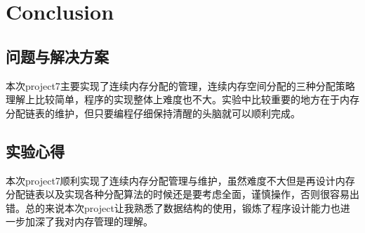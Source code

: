 \documentclass{article}
\begin{document}
\section{Conclusion}

\subsection{问题与解决方案}
本次project7主要实现了连续内存分配的管理，连续内存空间分配的三种分配策略理解上比较简单，程序的实现整体上难度也不大。实验中比较重要的地方在于内存分配链表的维护，但只要编程仔细保持清醒的头脑就可以顺利完成。

\subsection{实验心得}
本次project7顺利实现了连续内存分配管理与维护，虽然难度不大但是再设计内存分配链表以及实现各种分配算法的时候还是要考虑全面，谨慎操作，否则很容易出错。总的来说本次project让我熟悉了数据结构的使用，锻炼了程序设计能力也进一步加深了我对内存管理的理解。



\end{document}
